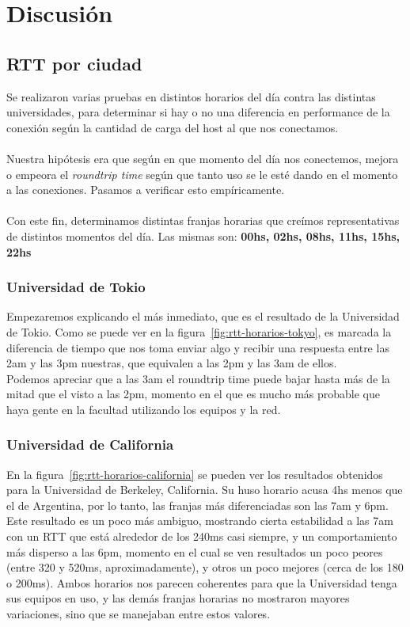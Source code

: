 \section{Discusión}

\subsection{RTT por ciudad}

Se realizaron varias pruebas en distintos horarios del día contra las distintas universidades, para determinar si hay o no una diferencia en performance de la conexión según la cantidad de carga del host al que nos conectamos.\\
\\
\indent Nuestra hipótesis era que según en que momento del día nos conectemos, mejora o empeora el \textit{roundtrip time} según que tanto uso se le esté dando en el momento a las conexiones. Pasamos a verificar esto empíricamente.\\
\\
\indent Con este fin, determinamos distintas franjas horarias que creímos representativas de distintos momentos del día. Las mismas son: \textbf{00hs, 02hs, 08hs, 11hs, 15hs, 22hs}

\subsubsection{Universidad de Tokio}
Empezaremos explicando el más inmediato, que es el resultado de la Universidad de Tokio. Como se puede ver en la figura~\ref{fig:rtt-horarios-tokyo}, es marcada la diferencia de tiempo que nos toma enviar algo y recibir una respuesta entre las 2am y las 3pm nuestras, que equivalen a las 2pm y las 3am de ellos.\\
\indent Podemos apreciar que a las 3am el roundtrip time puede bajar hasta más de la mitad que el visto a las 2pm, momento en el que es mucho más probable que haya gente en la facultad utilizando los equipos y la red.

\subsubsection{Universidad de California}
En la figura~\ref{fig:rtt-horarios-california} se pueden ver los resultados obtenidos para la Universidad de Berkeley, California. Su huso horario acusa 4hs menos que el de Argentina, por lo tanto, las franjas más diferenciadas son las 7am y 6pm.\\
\indent Este resultado es un poco más ambiguo, mostrando cierta estabilidad a las 7am con un RTT que está alrededor de los 240ms casi siempre, y un comportamiento más disperso a las 6pm, momento en el cual se ven resultados un poco peores (entre 320 y 520ms, aproximadamente), y otros un poco mejores (cerca de los 180 o 200ms). Ambos horarios nos parecen coherentes para que la Universidad tenga sus equipos en uso, y las demás franjas horarias no mostraron mayores variaciones, sino que se manejaban entre estos valores.

